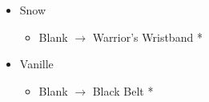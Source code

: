 \begin{paracol}{2}
\begin{menu}
\begin{itemize}
\begin{itemize}
{}%
{\paradigmline{\com}{(\com)}{(\com)}}%
{\paradigmline[2]{\textit{\com}}{\textit{(\com)}}{\textit{(\com)}}}%
{\paradigmline{\syn}{\sen}{(\sab)}}%
{\paradigmline{[\syn]}{\rav}{(\med)}}%
{\paradigmline{\rav}{\rav}{[\med]}}%
{\paradigmline{\rav}{\rav}{[\rav]}}
    \end{itemize}
    \equip
    \begin{itemize}
        \item Snow
        \begin{itemize}
            \item Blank $\rightarrow$ Warrior's Wristband *
        \end{itemize}
        \item Vanille
        \begin{itemize}
            \item Blank $\rightarrow$ Black Belt * 
        \end{itemize}
    \end{itemize}
\end{itemize}
\end{menu}
\switchcolumn*

\renewcommand{\first}{[1] Cerberus (\com/\com/\com)}
\renewcommand{\second}{[2] Cerberus (\com/\com/\com)}
\renewcommand{\third}{[3] Premeditation (\syn/\sen/\sab)}
\renewcommand{\fourth}{[4] Coordination (\syn/\rav/\med)}
\renewcommand{\fifth}{[5] Thaumaturgy (\rav/\rav/\med)}
\renewcommand{\sixth}{[6] Tri-Disaster (\rav/\rav/\rav)}


\end{paracol}
